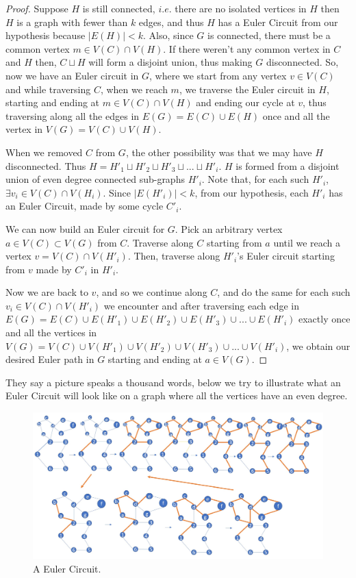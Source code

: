 \documentclass[12pt, fullpage]{article}
\begin{document}
\begin{proof}
 	  Suppose $H$ is still connected, $i.e.$ there are no isolated vertices in $H$ then $H$ is a graph with fewer than $k$ edges, and thus $H$ has a Euler Circuit from our hypothesis because $\vert E(H) \vert < k$. Also, since $G$ is connected, there must be a common vertex $m \in V(C) \cap V(H)$. If there weren't any common vertex in $C$ and $H$ then, $C \sqcup H$ will form a disjoint union, thus making $G$ disconnected. So, now we have an Euler circuit in $G$, where we start from any vertex $v \in V(C)$ and while traversing $C$, when we reach $m$, we traverse the Euler circuit in $H$, starting and ending at $m \in V(C) \cap V(H)$ and ending our cycle at $v$, thus traversing along all the edges in $E(G) = E(C) \cup E(H)$ once and all the vertex in $V(G) = V(C) \cup V(H)$.
 	 
 	   When we removed $C$ from $G$, the other possibility was that we may have $H$ disconnected. Thus $H = H'_1 \sqcup H'_2 \sqcup H'_3 \sqcup ... \sqcup H'_i$. $H$ is formed from a disjoint union of even degree connected sub-graphs $H'_i$. Note that, for each such $H'_i$, $\exists v_i \in V(C) \cap V(H_i)$. Since $\vert E(H'_i) \vert < k$, from our hypothesis, each $H'_i$ has an Euler Circuit, made by some cycle $C'_i$.
 	   
 	   We can now build an Euler circuit for $G$. Pick an arbitrary vertex $a \in V(C) \subset V(G)$ from $C$. Traverse along $C$ starting from $a$ until we reach a vertex $v = V(C) \cap V(H'_i)$. Then, traverse along $H'_i$'s Euler circuit starting from $v$ made by  $C'_i$ in $H'_i$. 
 	   
 	   Now we are back to $v$, and so we continue along $C$, and do the same for each such $v_i \in V(C) \cap V(H'_i)$ we encounter and after traversing each edge in $E(G) = E(C) \cup E(H'_1)\cup E(H'_2) \cup E(H'_3)\cup... \cup E(H'_i)$ exactly once and all the vertices in $V(G) = V(C) \cup V(H'_1)\cup V(H'_2) \cup V(H'_3) \cup... \cup V(H'_i)$, we obtain our desired Euler path in $G$ starting and ending at $a \in V(G)$. 	  
\end{proof} 
 	  They say a picture speaks a thousand words, below we try to illustrate what an Euler Circuit will look like on a graph where all the vertices have an even degree.
\begin{figure}[h!]
  \includegraphics[width=\linewidth]{circuit.jpg}
  \caption{A Euler Circuit.}
\end{figure}
\end{document}
